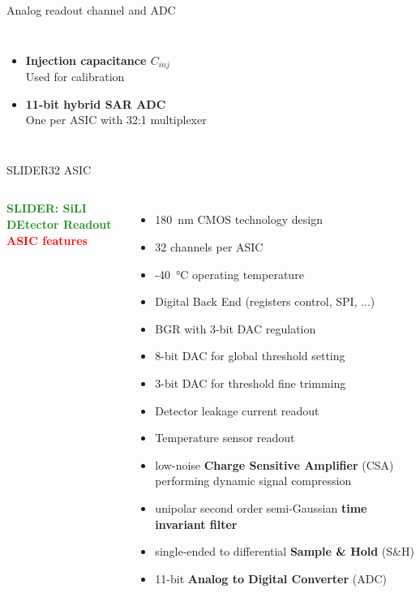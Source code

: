 \documentclass[aspectratio=169,xcolor=dvipsnames,handout]{beamer} %
\begin{document}
\begin{frame}{Analog readout channel and ADC}
\begin{columns}[T]
            \begin{itemize}
                \item \textbf{Injection capacitance $C_{inj}$}\\ Used for calibration
                \item \textbf{11-bit hybrid SAR ADC} \\ One per ASIC with 32:1 multiplexer
            \end{itemize}
    \end{columns}
\end{frame}


\begin{frame}{SLIDER32 ASIC}
   \begin{columns}
        \fontsize{10pt}{1}\selectfont
        \textbf{\textcolor{ForestGreen}{SLIDER: SiLI DEtector Readout}}\\
        \vspace{0.3cm}
        \fontsize{9.5pt}{1}\selectfont
        \textbf{\textcolor{Red}{ASIC features}}
        \vspace{0.1cm}
        \begin{itemize}
            \fontsize{9pt}{1}\selectfont
            \setlength\itemsep{0.3em}
            \item \SI{180}{\nano\meter} CMOS technology design
            \item 32 channels per ASIC
            \item -\SI{40}{\celsius} operating temperature
            \item Digital Back End (registers control, SPI, ...)
            \item BGR with 3-bit DAC regulation
            \item 8-bit DAC for global threshold setting
            \item 3-bit DAC for threshold fine trimming
            \item Detector leakage current readout
            \item Temperature sensor readout
            \item low-noise \textbf{Charge Sensitive Amplifier} (CSA) performing dynamic signal compression
            \item unipolar second order semi-Gaussian \textbf{time invariant filter}
            \item single-ended to differential \textbf{Sample \& Hold} (S\&H)
            \item 11-bit \textbf{Analog to Digital Converter} (ADC)
        \end{itemize}
  

\end{columns}
\end{frame}
\end{document}
